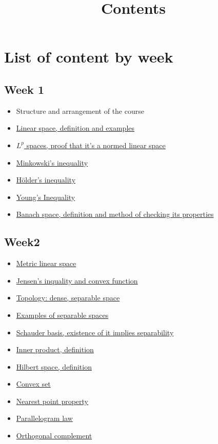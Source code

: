 \documentclass{article}
\title{Contents}
\begin{document}
\maketitle
\section{List of content by week}
\subsection{Week 1}
\begin{itemize}
	\item Structure and arrangement of the course
	\item \hyperref[vector space defs]{Linear space, definition and examples}
	\item \hyperref[lp space1]{$L^p$ spaces, proof that it's a normed linear space}
	\item \hyperref[Minkowski-holder]{Minkowski's inequality}
	\item \hyperref[Hölder's inequality]{Hölder's inequality}
	\item \hyperref[Young's Inequality]{Young's Inequality}
	\item \hyperref[banach space def]{Banach space, definition and method of checking its properties}
\end{itemize}
\subsection{Week2}
\begin{itemize}
	\item \hyperref[Metric linear space]{Metric linear space}
	\item \hyperref[Jensen's inquality]{Jensen's inquality and convex function}
	\item \hyperref[topology]{Topology: dense, separable space}
	\item \hyperref[separable space example]{Examples of separable spaces}
	\item \hyperref[Schauder basis]{Schauder basis, existence of it implies separability}
	\item \hyperref[Inner product]{Inner product, definition}
	\item \hyperref[Hilbert space def]{Hilbert space, definition}
	\item \hyperref[convexity]{Convex set}
	\item \hyperref[Nearest Point Property]{Nearest point property}
	      \item\hyperref[parallelogram]{Parallelogram law}
	\item \hyperref[ortho comp]{Orthogonal complement}
\end{itemize}
\end{document}
